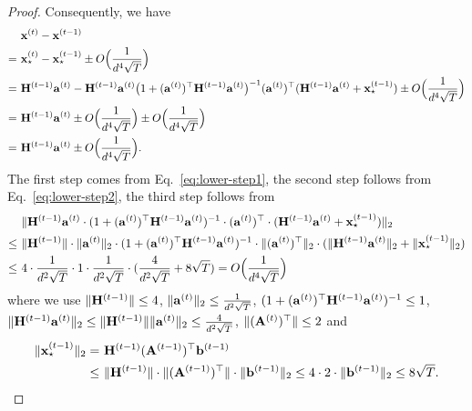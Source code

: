 \begin{proof}
Consequently, we have
\begin{align}
    &~ \mathbf{x}^{(t)} - \mathbf{x}^{(t-1)} \notag\\
    = &~ \mathbf{x}_{\star}^{(t)} - \mathbf{x}_{\star}^{(t-1)} \pm O\Big(\frac{1}{d^4\sqrt{T}}\Big) \notag\\
    = &~ \mathbf{H}^{(t-1)} \mathbf{a}^{(t)}  - \mathbf{H}^{(t-1)} \mathbf{a}^{(t)} \big(1+ (\mathbf{a}^{(t)})^{\top}\mathbf{H}^{(t-1)} \mathbf{a}^{(t)}\big)^{-1} (\mathbf{a}^{(t)})^{\top} (\mathbf{H}^{(t-1)} \mathbf{a}^{(t)}+\mathbf{x}_{\star}^{(t-1)}) \pm O\Big(\frac{1}{d^4\sqrt{T}}\Big)\notag\\
    = &~ \mathbf{H}^{(t-1)} \mathbf{a}^{(t)} \pm O\Big(\frac{1}{d^4\sqrt{T}}\Big) \pm O\Big(\frac{1}{d^4\sqrt{T}}\Big)\notag\\
    = &~ \mathbf{H}^{(t-1)} \mathbf{a}^{(t)} \pm O\Big(\frac{1}{d^4\sqrt{T}}\Big). \label{eq:lower-step3}
\end{align}
The first step comes from Eq.~\eqref{eq:lower-step1}, the second step follows from Eq.~\eqref{eq:lower-step2}, the third step follows from
\begin{align*}
&~ \|\mathbf{H}^{(t-1)} \mathbf{a}^{(t)} \cdot (1+ (\mathbf{a}^{(t)})^{\top}\mathbf{H}^{(t-1)} \mathbf{a}^{(t)})^{-1} \cdot (\mathbf{a}^{(t)})^{\top} \cdot (\mathbf{H}^{(t-1)} \mathbf{a}^{(t)}+\mathbf{x}_{\star}^{(t-1)})\|_2\\
\leq &~ \|\mathbf{H}^{(t-1)} \| \cdot \|\mathbf{a}^{(t)}\|_2 \cdot (1+ (\mathbf{a}^{(t)})^{\top}\mathbf{H}^{(t-1)} \mathbf{a}^{(t)})^{-1} \cdot \| (\mathbf{a}^{(t)})^{\top}\|_2 \cdot (\|\mathbf{H}^{(t-1)} \mathbf{a}^{(t)}\|_2+\|\mathbf{x}_{\star}^{(t-1)}\|_2)\\
 \leq &~ 4\cdot \frac{1}{d^2\sqrt{T}}\cdot 1 \cdot \frac{1}{d^2\sqrt{T}}\cdot (\frac{4}{d^2\sqrt{T}} + 8\sqrt{T}) = O\Big(\frac{1}{d^4\sqrt{T}}\Big)
\end{align*}
where we use $\|\mathbf{H}^{(t-1)} \|\leq 4$, $\|\mathbf{a}^{(t)}\|_2 \leq \frac{1}{d^2\sqrt{T}}$, $(1+ (\mathbf{a}^{(t)})^{\top}\mathbf{H}^{(t-1)} \mathbf{a}^{(t)})^{-1} \leq 1$, $\|\mathbf{H}^{(t-1)} \mathbf{a}^{(t)}\|_2 \leq \|\mathbf{H}^{(t-1)} \|\|\mathbf{a}^{(t)}\|_2 \leq \frac{4}{d^2\sqrt{T}}$, $\|(\mathbf{A}^{(t)})^{\top} \|\leq 2$ and
\begin{align*}
\|\mathbf{x}_{\star}^{(t-1)}\|_2 = &~ \mathbf{H}^{(t-1)} (\mathbf{A}^{(t-1)})^{\top} \mathbf{b}^{(t-1)} \\
\leq &~ \|\mathbf{H}^{(t-1)}\| \cdot \|(\mathbf{A}^{(t-1)})^{\top} \| \cdot \|\mathbf{b}^{(t-1)}\|_2
\leq 4 \cdot 2 \cdot \|\mathbf{b}^{(t-1)}\|_2\leq 8\sqrt{T}. 
\end{align*}


\end{proof}
